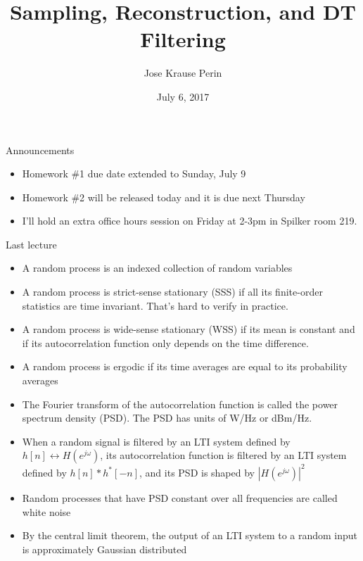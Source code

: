 \documentclass[10pt]{beamer}
\title[EE 264]{Sampling, Reconstruction, and DT Filtering}
\author{Jose Krause Perin}
\institute{Stanford University}
\date{July 6, 2017}
\begin{document}
\begin{frame}
  \titlepage
\end{frame}


\begin{frame}{Announcements}

\begin{itemize}
	\item Homework \#1 due date extended to Sunday, July 9
	\item Homework \#2 will be released today and it is due next Thursday
	\item I'll hold an extra office hours session on Friday at 2-3pm in Spilker room 219.
\end{itemize}

\end{frame}


\begin{frame}{Last lecture}
\begin{itemize}
	\item A random process is an indexed collection of random variables
	\item A random process is strict-sense stationary (SSS) if all its finite-order statistics are time invariant. That's hard to verify in practice.
	\item A random process is wide-sense stationary (WSS) if its mean is constant and if its autocorrelation function only depends on the time difference. 
	\item A random process is ergodic if its time averages are equal to its probability averages
	\item The Fourier transform of the autocorrelation function is called the power spectrum density (PSD). The PSD has units of W/Hz or dBm/Hz.
	\item When a random signal is filtered by an LTI system defined by $h[n]\leftrightarrow H(e^{j\omega})$, its autocorrelation function is filtered by an LTI system defined by $h[n]\ast h^*[-n]$, and its PSD is shaped by $|H(e^{j\omega})|^2$
	\item Random processes that have PSD constant over all frequencies are called white noise
	\item By the central limit theorem, the output of an LTI system to a random input is approximately Gaussian distributed
\end{itemize}
\end{frame}
\end{document}
